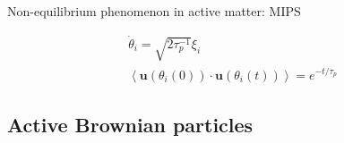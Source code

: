 \documentclass{beamer}
\begin{document}
\begin{frame}{Non-equilibrium phenomenon in active matter: MIPS}


\begin{minipage}{0.35\linewidth}
\begin{figure}
\centering

\end{figure}
\begin{eqnarray}
\dot{\theta}_i = \sqrt{2 \tau_p^{-1}} \xi_i\\
\left<\boldsymbol{u}(\theta_i(0)) \cdot \boldsymbol{u}(\theta_i(t))\right> = e^{-t/\tau_p}
\end{eqnarray}
\end{minipage}
\hfill
\begin{minipage}{0.6\linewidth}
\end{minipage}


\end{frame}

\subsection{Active Brownian particles}
\end{document}
